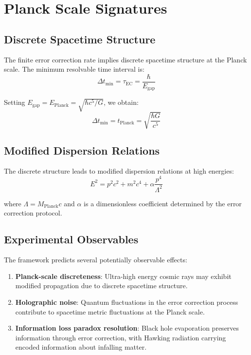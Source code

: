 \documentclass[12pt]{article}
\begin{document}
\section{Planck Scale Signatures}

\subsection{Discrete Spacetime Structure}

The finite error correction rate implies discrete spacetime structure at the Planck scale. The minimum resolvable time interval is:
\begin{equation}
\Delta t_{\min} = \tau_{\text{EC}} = \frac{\hbar}{E_{\text{gap}}}
\end{equation}

Setting $E_{\text{gap}} = E_{\text{Planck}} = \sqrt{\hbar c^5/G}$, we obtain:
\begin{equation}
\Delta t_{\min} = t_{\text{Planck}} = \sqrt{\frac{\hbar G}{c^5}}
\end{equation}

\subsection{Modified Dispersion Relations}

The discrete structure leads to modified dispersion relations at high energies:
\begin{equation}
E^2 = p^2c^2 + m^2c^4 + \alpha \frac{p^4}{\Lambda^2}
\end{equation}

where $\Lambda = M_{\text{Planck}}c$ and $\alpha$ is a dimensionless coefficient determined by the error correction protocol.

\subsection{Experimental Observables}

The framework predicts several potentially observable effects:

\begin{enumerate}
\item \textbf{Planck-scale discreteness}: Ultra-high energy cosmic rays may exhibit modified propagation due to discrete spacetime structure.

\item \textbf{Holographic noise}: Quantum fluctuations in the error correction process contribute to spacetime metric fluctuations at the Planck scale.

\item \textbf{Information loss paradox resolution}: Black hole evaporation preserves information through error correction, with Hawking radiation carrying encoded information about infalling matter.
\end{enumerate}
\end{document}
